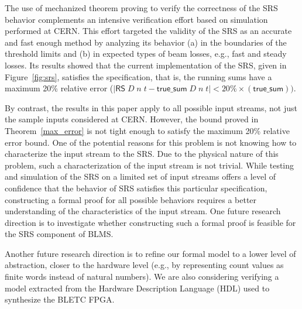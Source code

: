 \documentclass{llncs}
\begin{document}
The use of mechanized theorem proving to verify the correctness of the SRS behavior complements an intensive verification effort based on simulation performed at CERN.
This effort targeted the validity of the SRS as an accurate and fast enough method by analyzing its behavior (a) in the boundaries of the threshold limits and (b) in expected types of beam losses, e.g., fast and steady losses.
Its results showed that the current implementation of the SRS, given in Figure~\ref{fig:srs}, satisfies the specification, that is, the running sums have a maximum 20\% relative error ($|\mathsf{RS}\;D\;n\;t - \mathsf{true\_sum}\;D\;n\;t| < 20\%\times(\mathsf{true\_sum}))$.

By contrast, the results in this paper apply to all possible input streams, not just the sample inputs considered at CERN.
However, the bound proved in Theorem~\ref{max_error} is not tight enough to satisfy the maximum 20\% relative error bound.
One of the potential reasons for this problem is not knowing how to characterize the input stream to the SRS.
Due to the physical nature of this problem, such a characterization of the input stream is not trivial.
While testing and simulation of the SRS on a limited set of input streams offers a level of confidence that the behavior of SRS satisfies this particular specification, constructing a formal proof for all possible behaviors requires a better understanding of the characteristics of the input stream.
One future research direction is to investigate whether constructing such a formal proof is feasible for the SRS component of BLMS.

Another future research direction is to refine our formal model to a lower level of abstraction, closer to the hardware level (e.g., by representing count values as finite words instead of natural numbers).
We are also considering verifying a model extracted from the Hardware Description Language (HDL) used to synthesize the BLETC FPGA.

\end{document}
